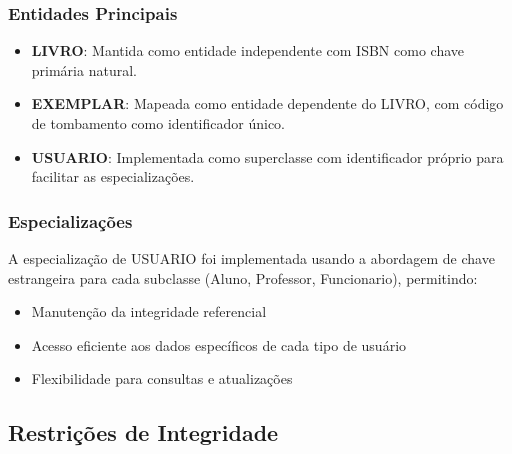 \documentclass[12pt,a4paper]{article}
\begin{document}
\subsubsection{Entidades Principais}
\begin{itemize}
    \item \textbf{LIVRO}: Mantida como entidade independente com ISBN como chave primária natural.
    \item \textbf{EXEMPLAR}: Mapeada como entidade dependente do LIVRO, com código de tombamento como identificador único.
    \item \textbf{USUARIO}: Implementada como superclasse com identificador próprio para facilitar as especializações.
\end{itemize}

\subsubsection{Especializações}
A especialização de USUARIO foi implementada usando a abordagem de chave estrangeira para cada subclasse (Aluno, Professor, Funcionario), permitindo:
\begin{itemize}
    \item Manutenção da integridade referencial
    \item Acesso eficiente aos dados específicos de cada tipo de usuário
    \item Flexibilidade para consultas e atualizações
\end{itemize}

\subsection{Restrições de Integridade}
\end{document}
